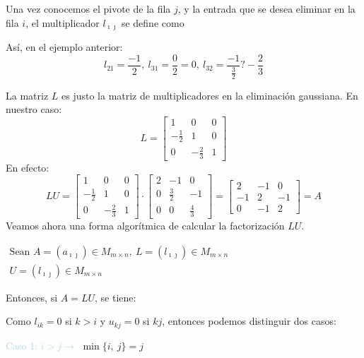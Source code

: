 \documentclass[12pt]{article}
\begin{document}
Una vez conocemos el pivote de la fila $j$, y la entrada que se
desea eliminar en la fila $i$, el multiplicador $l_{\imath\jmath  }$ se
define como
\begin{center}
\end{center}
Así, en el ejemplo anterior:
\[l_{21}=\dfrac{-1}{2},~l_{31}=\dfrac{0}{2}=0,~l_{32}=\dfrac{-1}{\frac{3}{2}}?-\dfrac{2}{3}\]

La matriz $L$ es justo la matriz de multiplicadores en la
eliminación gaussiana. En nuestro caso: \[L=\begin{bmatrix}
1 & 0 & 0 \\ 
-\frac{1}{2} & 1 & 0 \\ 
0 & -\frac{2}{3} & 1
\end{bmatrix} \]
En efecto:
\[LU=\begin{bmatrix}
1 & 0 & 0 \\ 
-\frac{1}{2} & 1 & 0 \\ 
0 & -\frac{2}{3} & 1
\end{bmatrix}\cdot\begin{bmatrix}
2 & -1 & 0 \\ 
0 & \frac{3}{2} & -1 \\ 
0 & 0 & \frac{4}{3}
\end{bmatrix}=\begin{bmatrix}
2 & -1 & 0 \\ 
-1 & 2 & -1 \\ 
0 & -1 & 2
\end{bmatrix}=A\]
Veamos ahora una forma algorítmica de calcular la factorización
$LU$.

$\begin{array}{r}
\text{Sean }A=(a_{\imath\jmath  })\in M_{m\times n},~L=(l_{\imath\jmath  })\in
M_{m\times n}\\
U=(l_{\imath\jmath  })\in M_{m\times n}
\end{array}$

Entonces, si $A=LU$, se tiene:

\begin{center}
\end{center}

Como $l_{ik}=0$ si $k>i$ y $u_{kj}=0$ si $kj$, entonces podemos
distinguir dos casos:

\textcolor{lightblue}{Caso 1: $i>j\longrightarrow$}
$\min\{i,~j\}=j$
\end{document}

